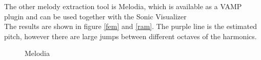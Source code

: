 \FloatBarrier
The other melody extraction tool is Melodia\cite{melodia1}, which is available as a VAMP plugin and can be used together with the Sonic Visualizer\cite{sonviz1}\\
The results are shown in figure \ref{fem} and \ref{ram}.
The purple line is the estimated pitch, however there are large jumps between different octaves of the harmonics. 

\begin{figure}[htbp]
	\centering
	\caption{Melodia}
	\label{fig:melodia}
\end{figure}

